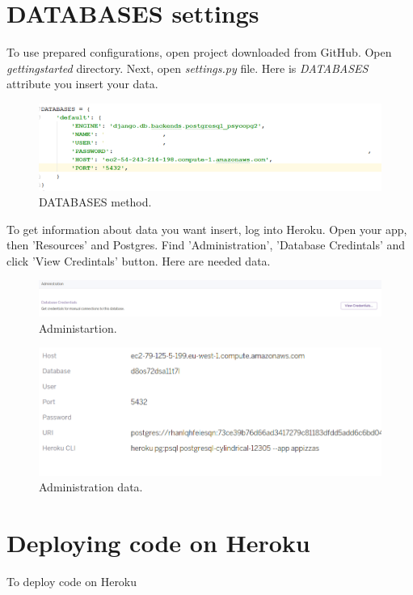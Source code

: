 \documentclass[12pt,a4paper]{article}
\begin{document}
\section{DATABASES settings}
To use prepared configurations, open project downloaded from GitHub. Open \textit{gettingstarted} directory. Next, open \textit{settings.py} file. Here is \textit{DATABASES} attribute you insert your data.  

\begin{figure}[H]
	\centering
	\includegraphics[width=1\textwidth]{images/databases.PNG}
	\caption{DATABASES method.}
	\label{fig:data}
\end{figure}

To get information about data you want insert, log into Heroku. Open your app, then 'Resources' and Postgres. Find 'Administration', 'Database Credintals' and click 'View Credintals' button. Here are needed data.

\begin{figure}[H]
	\centering
	\includegraphics[width=1\textwidth]{images/admin.PNG}
	\caption{Administartion.}
	\label{fig:ad}
\end{figure}

\begin{figure}[H]
	\centering
	\includegraphics[width=1\textwidth]{images/datas.PNG}
	\caption{Administration data.}
	\label{fig:da}
\end{figure}

\section{Deploying code on Heroku}
To deploy code on Heroku 
\end{document}
